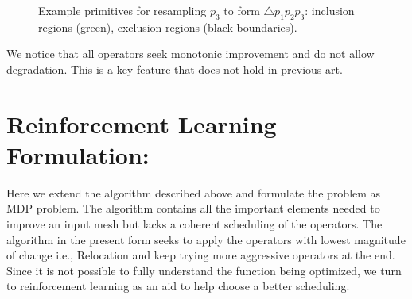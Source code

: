 \documentclass[a4paper,10pt]{article}
\begin{document}
\begin{figure}[!tb]
	\label{fig:operators}
\end{figure}

\begin{figure}[htb]
	\centering
	\quad
	\quad
	\caption{Example primitives for resampling $p_3$ to form $\triangle p_1 p_2 p_3$: inclusion regions (green), exclusion regions (black boundaries).}
	\label{fig:regions}
\end{figure}

We notice that all operators seek monotonic improvement and do not allow degradation. This is a key feature that does not hold in previous art. 

\section{Reinforcement Learning Formulation:}
Here we extend the algorithm described above and formulate the problem as MDP problem. The algorithm contains all the important elements needed to improve an input mesh but lacks a coherent scheduling of the operators. The algorithm in the present form seeks to apply the operators with lowest magnitude of change i.e., Relocation and keep trying more aggressive operators at the end. Since it is not possible to fully understand the function being optimized, we turn to reinforcement learning as an aid to help choose a better scheduling.
\end{document}
